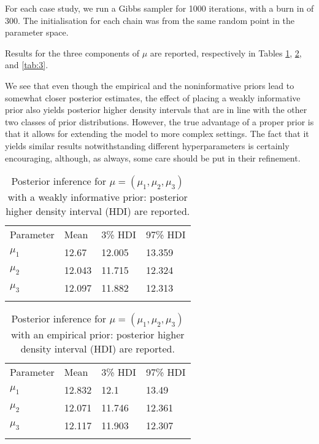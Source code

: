 \documentclass[graybox]{svmult}
\begin{document}
For each case study, we run a Gibbs sampler for 1000 iterations, with
a burn in of 300. The initialisation for each chain was from the same
random point in the parameter space.

Results for the three components of $\mu$ are reported, respectively
in Tables \ref{tab:1}, \ref{tab:2}, and \ref{tab:3}.

We see that even though the empirical and the noninformative priors
lead to somewhat closer posterior estimates, the effect of placing a
weakly informative prior also yields posterior higher density
intervals that are in line with the other two classes of prior
distributions. However, the true advantage of a proper prior is that
it allows for extending the model to more complex settings. The fact
that it yields similar results notwithstanding different
hyperparameters is certainly encouraging, although, as always, some
care should be put in their refinement.

\begin{table}
\caption{Posterior inference for $\mu = \left( \mu_{1}, \mu_{2}, \mu_{3} \right)$ with a weakly informative prior: posterior higher density interval (HDI) are reported.}
\label{tab:1}       %
%
%
\begin{tabular}{p{2cm}p{2.4cm}p{2cm}p{4.9cm}}
\hline\noalign{\smallskip}
Parameter & Mean & 3\% HDI & 97\% HDI \\
\noalign{\smallskip}\svhline\noalign{\smallskip}
$\mu_{1}$ & 12.67  & 12.005 & 13.359 \\
$\mu_2$ & 12.043 & 11.715 & 12.324\\
$\mu_3$ & 12.097  & 11.882 & 12.313 \\
\noalign{\smallskip}\hline\noalign{\smallskip}
\end{tabular}
\end{table}

\begin{table}
\caption{Posterior inference for $\mu = \left( \mu_{1}, \mu_{2}, \mu_{3}\right)$ with an empirical prior: posterior higher density interval (HDI) are reported.}
\label{tab:2}       %
%
%
\begin{tabular}{p{2cm}p{2.4cm}p{2cm}p{4.9cm}}
\hline\noalign{\smallskip}
Parameter & Mean & 3\% HDI & 97\% HDI \\
\noalign{\smallskip}\svhline\noalign{\smallskip}
$\mu_{1}$ & 12.832  & 12.1 & 13.49 \\
$\mu_2$ & 12.071 & 11.746 & 12.361\\
$\mu_3$ & 12.117  & 11.903 & 12.307 \\
\noalign{\smallskip}\hline\noalign{\smallskip}
\end{tabular}
\end{table}
\end{document}
